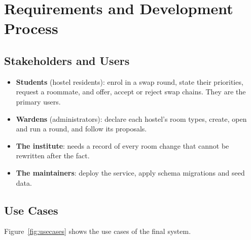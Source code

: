 
\chapter{Requirements and Development Process}
\label{ch:requirements}

\section{Stakeholders and Users}

\begin{itemize}
  \item \textbf{Students} (hostel residents): enrol in a swap round, state
  their priorities, request a roommate, and offer, accept or reject swap
  chains. They are the primary users.
  \item \textbf{Wardens} (administrators): declare each hostel's room
  types, create, open and run a round, and follow its proposals.
  \item \textbf{The institute}: needs a record of every room change that
  cannot be rewritten after the fact.
  \item \textbf{The maintainers}: deploy the service, apply schema
  migrations and seed data.
\end{itemize}

\section{Use Cases}

Figure~\ref{fig:usecases} shows the use cases of the final system.

